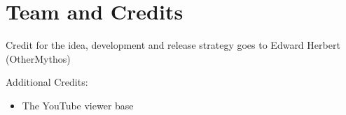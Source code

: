 \documentclass[a4paper]{scrreprt}
\begin{document}
%



\chapter{Team and Credits}

Credit for the idea, development and release strategy goes to Edward Herbert (OtherMythos)

Additional Credits:

    \begin{itemize}
        \item The YouTube viewer base
    \end{itemize}



%
%
\end{document}
